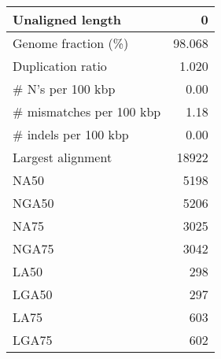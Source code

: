 \documentclass[12pt,a4paper]{article}
\begin{document}
\begin{table}[ht]
\begin{center}
\begin{tabular}{|l*{1}{|r}|}
Unaligned length & 0 \\ \hline
Genome fraction (\%) & 98.068 \\ \hline
Duplication ratio & 1.020 \\ \hline
\# N's per 100 kbp & 0.00 \\ \hline
\# mismatches per 100 kbp & 1.18 \\ \hline
\# indels per 100 kbp & 0.00 \\ \hline
Largest alignment & 18922 \\ \hline
NA50 & 5198 \\ \hline
NGA50 & 5206 \\ \hline
NA75 & 3025 \\ \hline
NGA75 & 3042 \\ \hline
LA50 & 298 \\ \hline
LGA50 & 297 \\ \hline
LA75 & 603 \\ \hline
LGA75 & 602 \\ \hline
\end{tabular}
\end{center}
\end{table}
\end{document}

